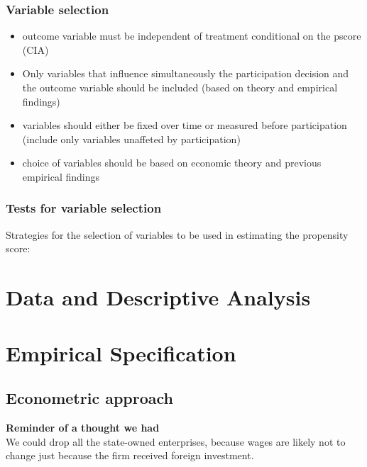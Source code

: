 \documentclass[a4paper,12pt]{scrartcl}
\begin{document}
\subsubsection*{Variable selection}
\begin{itemize}
\item outcome variable must be independent of treatment conditional on the pscore (CIA)
\item Only variables that influence simultaneously the participation decision and the outcome variable should be included (based on theory and empirical findings)
\item variables should either be fixed over time or measured before participation (include only variables unaffeted by participation)
\item choice of variables should be based on economic theory and previous empirical findings
\end{itemize}

\subsubsection*{Tests for variable selection}
Strategies for the selection of variables to be used in estimating the propensity score:



\section{Data and Descriptive Analysis}

\section{Empirical Specification}
\subsection{Econometric approach}
\textbf{Reminder of a thought we had}\\
We could drop all the state-owned enterprises, because wages are likely not to change just because the firm received foreign investment. \\\\
\end{document}
